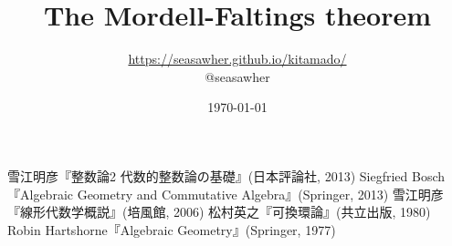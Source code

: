 \documentclass[10pt]{jsarticle}
\begin{document}
\title{The Mordell-Faltings theorem}
\author{\url{https://seasawher.github.io/kitamado/} \\ @seasawher}
\date{\today}
\maketitle



\newpage



\begin{thebibliography}{1}
 雪江明彦『整数論2 代数的整数論の基礎』(日本評論社, 2013)
 Siegfried Bosch『Algebraic Geometry and Commutative Algebra』(Springer, 2013)
 雪江明彦『線形代数学概説』(培風館, 2006)
   松村英之『可換環論』(共立出版, 1980)
   Robin Hartshorne『Algebraic Geometry』(Springer, 1977)
\end{thebibliography}
\end{document}
